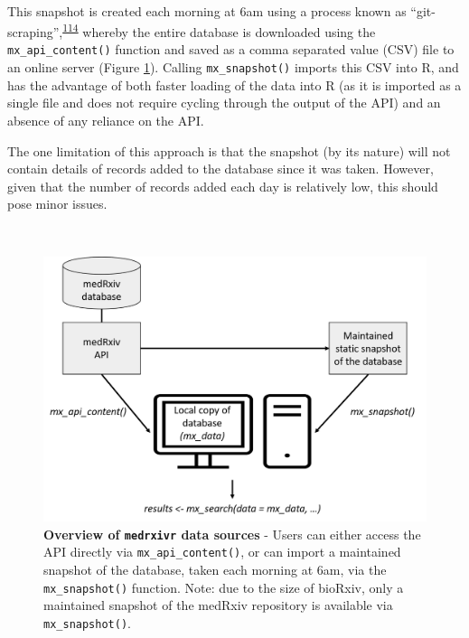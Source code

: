 \documentclass[a4paper, twoside]{templates/ociamthesis}
\begin{document}
~

This snapshot is created each morning at 6am using a process known as ``git-scraping'',\textsuperscript{\protect\hyperlink{ref-zotero-15031}{114}} whereby the entire database is downloaded using the \texttt{mx\_api\_content()} function and saved as a comma separated value (CSV) file to an online server (Figure \ref{fig:medrxivr-data-sources}). Calling \texttt{mx\_snapshot()} imports this CSV into R, and has the advantage of both faster loading of the data into R (as it is imported as a single file and does not require cycling through the output of the API) and an absence of any reliance on the API.

The one limitation of this approach is that the snapshot (by its nature) will not contain details of records added to the database since it was taken. However, given that the number of records added each day is relatively low, this should pose minor issues.

~





\begin{figure}[H]
\includegraphics[width=1\linewidth]{figures/sys-rev-tools/data_sources} \caption[Overview of \texttt{medrxivr} data sources]{\textbf{Overview of \texttt{medrxivr} data sources} - Users can either access the API directly via \texttt{mx\_api\_content()}, or can import a maintained snapshot of the database, taken each morning at 6am, via the \texttt{mx\_snapshot()} function. Note: due to the size of bioRxiv, only a maintained snapshot of the medRxiv repository is available via \texttt{mx\_snapshot()}.}\label{fig:medrxivr-data-sources}
\end{figure}
\end{document}
